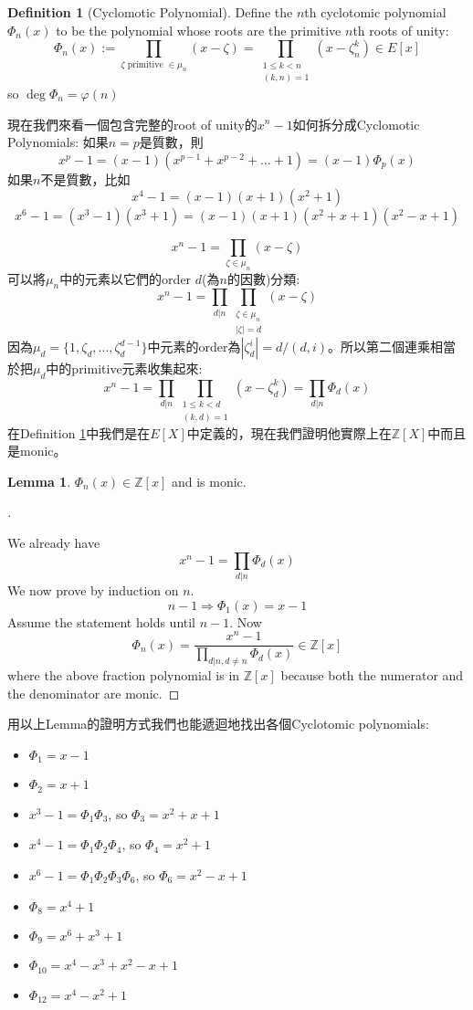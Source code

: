 \documentclass{article}
\theoremstyle{definition}
\newtheorem{lem}{Lemma}
\newtheorem{dfn}{Definition}
\newenvironment{proofs}[1][\proofname]{%
  \begin{proof}[#1]$ $\par\nobreak\ignorespaces
}{%
  \end{proof}
}
\newcommand{\ZZ}{\mathbb Z}
\begin{document}
\begin{dfn}[Cyclomotic Polynomial]\label{cyclomotic_polynomial}
	Define the $n$th cyclotomic polynomial $\Phi_n(x)$ to be the polynomial whose roots are the primitive $n$th roots of unity:
	\[
		\Phi_n(x):=\prod_{\zeta\text{ primitive }\in \mu_n}(x-\zeta)=\prod_{\substack{ 1\le k < n \\ (k,n)=1}}(x-\zeta_n^k)\in E[x]
	\]
	so $\deg \Phi_n = \varphi(n)$
\end{dfn}

現在我們來看一個包含完整的root of unity的$x^n-1$如何拆分成Cyclomotic Polynomials:
如果$n=p$是質數，則
\[x^p-1=(x-1)(x^{p-1}+x^{p-2}+\dots+1)=(x-1)\Phi_p(x)\]
如果$n$不是質數，比如
\[x^4-1=(x-1)(x+1)(x^2+1)\]
\[x^6-1=(x^3-1)(x^3+1)=(x-1)(x+1)(x^2+x+1)(x^2-x+1)\]

\[
	x^n-1=\prod_{\zeta\in\mu_n}(x-\zeta)
\]
可以將$\mu_n$中的元素以它們的order $d$(為$n$的因數)分類:
\[
	x^n-1=\prod_{d|n}\prod_{\substack{\zeta\in\mu_n\\|\zeta|=d}}(x-\zeta)
\]
因為$\mu_d=\{1,\zeta_d,\dots,\zeta_{d}^{d-1}\}$中元素的order為$|\zeta_d^i|=d/(d,i)$。所以第二個連乘相當於把$\mu_d$中的primitive元素收集起來:
\[
	x^n-1=\prod_{d|n}\prod_{\substack{1\le k<d\\(k,d)=1}}(x-\zeta_d^k)=\prod_{d|n} \Phi_d(x)
\]
在Definition \ref{cyclomotic_polynomial}中我們是在$E[X]$中定義的，現在我們證明他實際上在$\ZZ[X]$中而且是monic。
\begin{lem}
	$\Phi_n(x) \in \mathbb{Z}[x]$ and is monic.
\end{lem}

\begin{proofs}
	We already have
	\[
		x^n - 1 = \prod_{d | n} \Phi_d(x)
	\]
	We now prove by induction on $n$.
	\[
		n - 1 \Rightarrow \Phi_1(x) = x- 1
	\]
	Assume the statement holds until $n - 1$.
	Now
	\[
		\Phi_n(x) = \frac{x^n - 1}{\prod_{d|n, d \neq n} \Phi_d(x)} \in \mathbb{Z}[x]
	\]
	where the above fraction polynomial is in $\mathbb{Z}[x]$ because both the numerator and the denominator are monic.
\end{proofs}

用以上Lemma的證明方式我們也能遞迴地找出各個Cyclotomic polynomials:
\begin{itemize}
	\item $\Phi_1=x-1$
	\item $\Phi_2=x+1$
	\item $x^3-1=\Phi_1\Phi_3$, so $\Phi_3=x^2+x+1$
	\item $x^4-1=\Phi_1\Phi_2\Phi_4$, so $\Phi_4=x^2+1$
	\item $x^6-1=\Phi_1\Phi_2\Phi_3\Phi_6$, so $\Phi_6=x^2-x+1$
	\item $\Phi_8=x^4+1$
	\item $\Phi_9=x^6+x^3+1$
	\item $\Phi_{10}=x^4-x^3+x^2-x+1$
	\item $\Phi_{12}=x^4-x^2+1$
\end{itemize}
\end{document}
